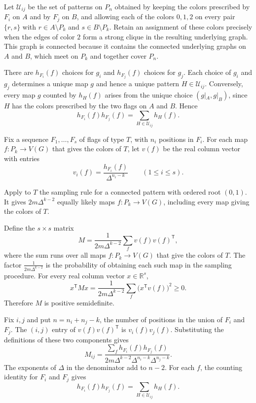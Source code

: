 \documentclass[preprint,11pt,numbers]{elsarticle-arxiv}
\numberwithin{equation}{section}
\theoremstyle{definition}
\begin{document}
Let $\mathcal U_{ij}$ be the set of patterns on $P_n$ obtained by
keeping the colors prescribed by $F_i$ on $A$ and by $F_j$ on $B$,
and allowing each of the colors $0,1,2$ on every pair $\{r,s\}$ with
$r\in A\setminus P_k$ and $s\in B\setminus P_k$. Retain an
assignment of these colors precisely when the edges of color $2$
form a strong clique in the resulting underlying graph. This graph
is connected because it contains the connected underlying graphs
on $A$ and $B$, which meet on $P_k$ and together cover $P_n$.

There are $h_{F_i}(f)$ choices for $g_i$ and $h_{F_j}(f)$ choices
for $g_j$. Each choice of $g_i$ and $g_j$ determines a unique map
$g$ and hence a unique pattern $H\in\mathcal U_{ij}$. Conversely,
every map $g$ counted by $h_H(f)$ arises from the unique choice
$(g|_A,g|_B)$, since $H$ has the colors prescribed by the two flags
on $A$ and $B$. Hence
\[
 h_{F_i}(f)h_{F_j}(f)=\sum_{H\in\mathcal U_{ij}}h_H(f).
\]

Fix a sequence $F_1,\ldots,F_s$ of flags of type $T$, with $n_i$
positions in $F_i$. For each map $f\colon P_k\to V(G)$ that gives the colors of
$T$, let $v(f)$ be the real column vector with entries
\[
 v_i(f)=\frac{h_{F_i}(f)}{\Delta^{n_i-k}}
 \qquad (1\leq i\leq s).
\]

Apply to $T$ the sampling rule for a connected pattern with ordered
root $(0,1)$. It gives $2m\Delta^{k-2}$ equally likely maps
$f\colon P_k\to V(G)$, including every map giving the colors of $T$.

Define the $s\times s$ matrix
\[
 M=\frac{1}{2m\Delta^{k-2}}\sum_f v(f)v(f)^{\mathsf T},
\]
where the sum runs over all maps $f\colon P_k\to V(G)$ that give the
colors of $T$. The factor $\frac{1}{2m\Delta^{k-2}}$ is the probability
of obtaining each such map in the sampling procedure. For every
real column vector $x\in\mathbb R^s$,
\[
 x^{\mathsf T}Mx
 =\frac{1}{2m\Delta^{k-2}}\sum_f\bigl(x^{\mathsf T}v(f)\bigr)^2
 \geq 0.
\]
Therefore $M$ is positive semidefinite.

Fix $i,j$ and put $n=n_i+n_j-k$, the number of positions in the
union of $F_i$ and $F_j$. The $(i,j)$ entry of $v(f)v(f)^{\mathsf T}$
is $v_i(f)v_j(f)$. Substituting the definitions of these two
components gives
\[
 M_{ij}
 =\frac{\displaystyle\sum_f h_{F_i}(f)h_{F_j}(f)}
        {2m\Delta^{k-2}\Delta^{n_i-k}\Delta^{n_j-k}}.
\]
The exponents of $\Delta$ in the denominator add to $n-2$.
For each $f$, the counting identity for $F_i$ and $F_j$ gives
\[
 h_{F_i}(f)h_{F_j}(f)=\sum_{H\in\mathcal U_{ij}}h_H(f).
\]
\end{document}
